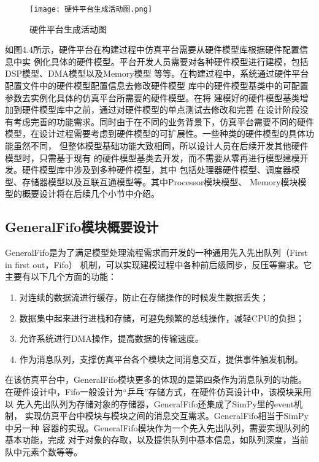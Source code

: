 \begin{figure}[h]
    \centering
    \texttt{[image: 硬件平台生成活动图.png]}
    \caption{硬件平台生成活动图}
    \label{fig:badge}
\end{figure}

如图4.4所示，硬件平台在构建过程中仿真平台需要从硬件模型库根据硬件配置信息中实
例化具体的硬件模型。平台开发人员需要对各种硬件模型进行建模，包括DSP模型、DMA模型以及Memory模型
等等。在构建过程中，系统通过硬件平台配置文件中的硬件模型配置信息去修改硬件模型
库中的硬件模型基类中的可配置参数去实例化具体的仿真平台所需要的硬件模型。在将
建模好的硬件模型基类增加到硬件模型库中之前，通过对硬件模型的单点测试去修改和完善
在设计阶段没有考虑完善的功能需求。同时由于在不同的业务背景下，仿真平台需要不同的硬件
模型，在设计过程需要考虑到硬件模型的可扩展性。一些种类的硬件模型的具体功能虽然不同，
但整体模型基础功能大致相同，所以设计人员在后续开发其他硬件模型时，只需基于现有
的硬件模型基类去开发，而不需要从零再进行模型建模开发。硬件模型库中涉及到多种硬件模型，其中
包括处理器硬件模型、调度器模型、存储器模型以及互联互通模型等。其中Processor模块模型、
Memory模块模型的概要设计将在后续几个小节中介绍。

\subsection{GeneralFifo模块概要设计}
GeneralFifo是为了满足模型处理流程需求而开发的一种通用先入先出队列（First in first out，Fifo）
机制\cite{31}，可以实现建模过程中各种前后级同步，反压等需求。它主要有以下几个方面的功能：

\begin{enumerate}
    \item 对连续的数据流进行缓存，防止在存储操作的时候发生数据丢失；
    \item 数据集中起来进行进栈和存储，可避免频繁的总线操作，减轻CPU的负担；
    \item 允许系统进行DMA操作，提高数据的传输速度。
    \item 作为消息队列，支撑仿真平台各个模块之间消息交互，提供事件触发机制。
\end{enumerate}

在该仿真平台中，GeneralFifo模块更多的体现的是第四条作为消息队列的功能。
在硬件设计中，Fifo一般设计为“乒乓”存储方式，在硬件仿真设计中，该模块采用以
先入先出队列为存储对象的存储器，GeneralFifo还集成了SimPy里的event机制，
实现仿真平台中模块与模块之间的消息交互需求。GeneralFifo相当于SimPy中另一种
容器的实现。GeneralFifo模块作为一个先入先出队列，需要实现队列的基本功能，完成
对于对象的存取，以及提供队列中基本信息，如队列深度，当前队中元素个数等等。

